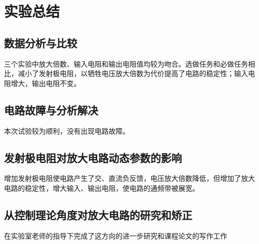 \documentclass[UTF8,a4paper]{ctexart}
\begin{document}
\section{实验总结}
\subsection{数据分析与比较}
三个实验中放大倍数、输入电阻和输出电阻值均较为吻合。选做任务和必做任务相比，减小了发射极电阻，以牺牲电压放大倍数为代价提高了电路的稳定性；输入电阻增大，输出电阻不变。
\subsection{电路故障与分析解决}
本次试验较为顺利，没有出现电路故障。
\subsection{发射极电阻对放大电路动态参数的影响}
增加发射极电阻使电路产生了交、直流负反馈，电压放大倍数降低，但增加了放大电路的稳定性，增大输入、输出电阻，使电路的通频带被展宽。
\subsection{从控制理论角度对放大电路的研究和矫正}
在实验室老师的指导下完成了这方向的进一步研究和课程论文的写作工作
\end{document}

